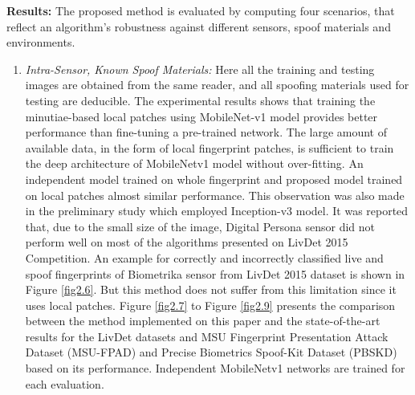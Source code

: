 \textbf{Results:} 
The proposed method is evaluated by computing four scenarios, that reflect an algorithm's robustness against different sensors, spoof materials and environments. 
\begin{enumerate}
\item \textit{Intra-Sensor, Known Spoof Materials:} 
 Here all the training and testing images are obtained from the same reader, and all spoofing materials used for testing are deducible. The experimental results shows that training the minutiae-based local patches using MobileNet-v1 model provides better performance than fine-tuning a pre-trained network. The large amount of available data, in the form of local fingerprint patches, is sufficient to train the deep architecture of MobileNetv1 model without over-fitting. An independent model trained on whole fingerprint and proposed model trained on local patches almost similar performance. This observation was also made in the preliminary study which employed Inception-v3 model. It was reported that, due to the small size of the image, Digital Persona sensor did not perform well on most of the algorithms presented on LivDet 2015 Competition. An example for correctly and incorrectly classified live and spoof fingerprints of Biometrika sensor from LivDet 2015 dataset is shown in Figure \ref{fig2.6}. But this method does not suffer from this limitation since it uses local patches. Figure \ref{fig2.7} to Figure \ref{fig2.9} presents the  comparison between the method implemented on this paper and the state-of-the-art results for the LivDet datasets and MSU Fingerprint Presentation Attack Dataset (MSU-FPAD) and Precise Biometrics Spoof-Kit Dataset (PBSKD) based on its performance. Independent MobileNetv1 networks are trained for each evaluation. 

\end{enumerate}
